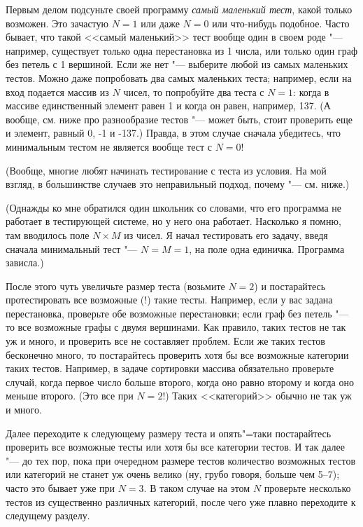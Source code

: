 \documentclass[a4paper,10pt]{problems}
\begin{document}
Первым делом подсуньте своей программу \textit{самый маленький тест}, какой только возможен. Это зачастую $N=1$ или даже $N=0$ или что-нибудь подобное. Часто бывает, что такой <<самый маленький>> тест вообще один в своем роде "--- например, существует только одна перестановка из 1 числа, или только один граф без петель с 1 вершиной. Если же нет "--- выберите любой из самых маленьких тестов. Можно даже попробовать два самых маленьких теста; например, если на вход подается массив из $N$ чисел, то попробуйте два теста с $N=1$: когда в массиве единственный элемент равен 1 и когда он равен, например, 137. (А вообще, см. ниже про разнообразие тестов "--- может быть, стоит проверить еще и элемент, равный 0, -1 и -137.) Правда, в этом случае сначала убедитесь, что минимальным тестом не является вообще тест с $N=0$!

(Вообще, многие любят начинать тестирование с теста из условия. На мой взгляд, в большинстве случаев это неправильный подход, почему "--- см. ниже.)

(Однажды ко мне обратился один школьник со словами, что его программа не работает в тестирующей системе, но у него она работает.
Насколько я помню, там вводилось поле $N\times M$ из чисел. 
Я начал тестировать его задачу, введя сначала минимальный тест "--- $N=M=1$, на поле одна единичка. 
Программа зависла.)

После этого чуть увеличьте размер теста (возьмите $N=2$) и постарайтесь протестировать все возможные (!) такие тесты. 
Например, если у вас задана перестановка, проверьте обе возможные перестановки; если граф без петель "--- то все возможные графы с двумя вершинами. 
Как правило, таких тестов не так уж и много, и проверить все не составляет проблем. 
Если же таких тестов бесконечно много, то постарайтесь проверить хотя бы все возможные категории таких тестов. 
Например, в задаче сортировки массива обязательно проверьте случай, когда первое число больше второго, когда оно равно второму и когда оно меньше второго. 
(Это все при $N=2$!) Таких <<категорий>> обычно не так уж и много.

Далее переходите к следующему размеру теста и опять"=таки постарайтесь проверить все возможные тесты или хотя бы все категории тестов. И так далее "--- до тех пор, пока при очередном размере тестов количество возможных тестов или категорий не станет уж очень велико (ну, грубо говоря, больше чем 5--7); часто это бывает уже при $N=3$. В таком случае на этом $N$ проверьте несколько тестов из существенно различных категорий, после чего уже плавно переходите к следущему разделу.
\end{document}
